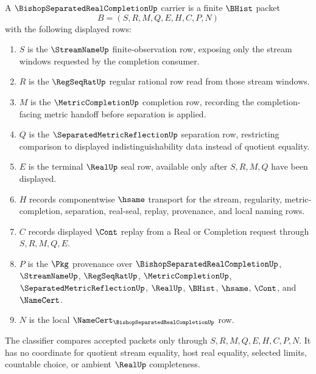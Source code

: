 \begin{definition}
\label{def:bishop-separated-real-completion-carrier}
A $\BishopSeparatedRealCompletionUp$ carrier is a finite $\BHist$ packet
$$
B=(S,R,M,Q,E,H,C,P,N)
$$
with the following displayed rows:
\begin{enumerate}
\item $S$ is the $\StreamNameUp$ finite-observation row, exposing only the stream windows requested by the completion consumer.
\item $R$ is the $\RegSeqRatUp$ regular rational row read from those stream windows.
\item $M$ is the $\MetricCompletionUp$ completion row, recording the completion-facing metric handoff before separation is applied.
\item $Q$ is the $\SeparatedMetricReflectionUp$ separation row, restricting comparison to displayed indistinguishability data instead of quotient equality.
\item $E$ is the terminal $\RealUp$ seal row, available only after $S,R,M,Q$ have been displayed.
\item $H$ records componentwise $\hsame$ transport for the stream, regularity, metric-completion, separation, real-seal, replay, provenance, and local naming rows.
\item $C$ records displayed $\Cont$ replay from a Real or Completion request through $S,R,M,Q,E$.
\item $P$ is the $\Pkg$ provenance over $\BishopSeparatedRealCompletionUp$, $\StreamNameUp$, $\RegSeqRatUp$, $\MetricCompletionUp$, $\SeparatedMetricReflectionUp$, $\RealUp$, $\BHist$, $\hsame$, $\Cont$, and $\NameCert$.
\item $N$ is the local $\NameCert_{\BishopSeparatedRealCompletionUp}$ row.
\end{enumerate}
The classifier compares accepted packets only through $S,R,M,Q,E,H,C,P,N$. It has no coordinate for quotient stream equality, host real equality, selected limits, countable choice, or ambient $\RealUp$ completeness.
\end{definition}

